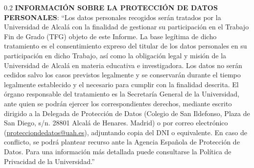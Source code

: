 %

\begin{spacing}{0.2}
  {\footnotesize \noindent \textbf{INFORMACIÓN SOBRE LA PROTECCIÓN DE DATOS PERSONALES}:
``Los datos personales recogidos serán tratados por la Universidad de Alcalá con la finalidad de gestionar su participación en el Trabajo Fin de Grado (TFG) objeto de este Informe. La base legítima de dicho tratamiento es el consentimiento expreso del titular de los datos personales en su participación en dicho Trabajo, así como la obligación legal y misión de la Universidad de Alcalá en materia educativa e investigadora. Los datos no serán cedidos salvo los casos previstos legalmente y se conservarán durante el tiempo legalmente establecido y el necesario para cumplir con la finalidad descrita. El órgano responsable del tratamiento es la Secretaría General de la Universidad, ante quien se podrán ejercer los correspondientes derechos, mediante escrito dirigido a la Delegada de Protección de Datos (Colegio de San Ildefonso, Plaza de San Diego, s/n. 28801 Alcalá de Henares. Madrid) o por correo electrónico (\href{mailto:protecciondedatos@uah.es}{protecciondedatos@uah.es}), adjuntando copia del DNI o equivalente. En caso de conflicto, se podrá plantear recurso ante la Agencia Española de Protección de Datos. Para una información más detallada puede consultarse la Política de Privacidad de la Universidad.''}
\end{spacing}
